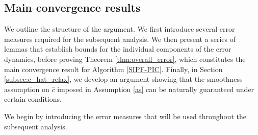 \documentclass[review,onefignum,onetabnum]{siamart250211}
\begin{document}

\subsection{Main convergence results}\label{subsec:main_convergence_proof}
We outline the structure of the argument. We first introduce several error measures required for the subsequent analysis. We then present a series of lemmas that establish bounds for the individual components of the error dynamics, before proving Theorem \ref{thm:overall_error}, which constitutes the main convergence result for Algorithm \ref{SIPF-PIC}. Finally, in Section \ref{subsec:c_hat_relax}, we develop an argument showing that the smoothness assumption on $\hat{c}$ imposed in Assumption \ref{as} can be naturally guaranteed under certain conditions.

We begin by introducing the error measures that will be used throughout the subsequent analysis.
\end{document}
